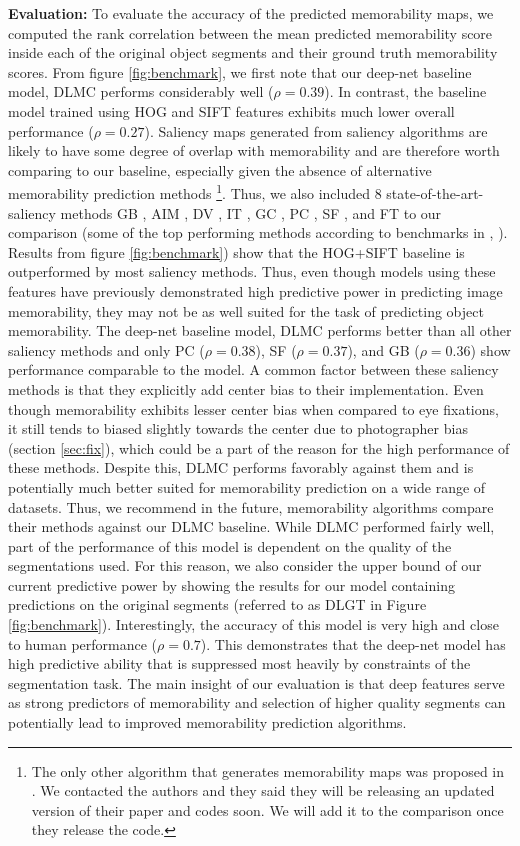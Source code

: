 \textbf{Evaluation: } To evaluate the accuracy of the predicted memorability maps, we computed the rank correlation between the mean predicted memorability score inside each of the original object segments and their ground truth memorability scores. From figure \ref{fig:benchmark}, we first note that our deep-net baseline model, DLMC performs considerably well ($\rho = 0.39$). In contrast, the baseline model trained using HOG and SIFT features exhibits much lower overall performance ($\rho = 0.27$). Saliency maps generated from saliency algorithms are likely to have some degree of overlap with memorability and are therefore worth comparing to our baseline, especially given the absence of alternative memorability prediction methods \footnote{The only other algorithm that generates memorability maps was proposed in \cite{khosla12}. We contacted the authors and they said they will be releasing an updated version of their paper and codes soon. We will add it to the comparison once they release the code.}. Thus, we also included $8$ state-of-the-art-saliency methods GB \cite{gb}, AIM \cite{aim}, DV \cite{dv}, IT \cite{it}, GC \cite{gc}, PC \cite{pc}, SF \cite{sf}, and FT \cite{ft} to our comparison (some of the top performing methods according to benchmarks in \cite{borji13}, \cite{borji12}).  Results from figure \ref{fig:benchmark}) show that the HOG+SIFT baseline is outperformed by most saliency methods. Thus, even though models using these features have previously demonstrated high predictive power in predicting image memorability, they may not be as well suited for the task of predicting object memorability. The deep-net baseline model, DLMC performs better than all other saliency methods and only PC ($\rho=0.38$), SF ($\rho=0.37$), and GB ($\rho=0.36$) show performance comparable to the model. A common factor between these saliency methods is that they explicitly add center bias to their implementation. Even though memorability exhibits lesser center bias when compared to eye fixations, it still tends to biased slightly towards the center due to photographer bias (section \ref{sec:fix}), which could be a  part of the reason for the high performance of these methods. Despite this, DLMC performs favorably against them and is potentially much better suited for memorability prediction on a wide range of datasets. Thus, we recommend in the future, memorability algorithms compare their methods against our DLMC baseline. While DLMC performed fairly well, part of the performance of this model is dependent on the quality of the segmentations used. For this reason, we also consider the upper bound of our current predictive power by showing the results for our model containing predictions on the original segments (referred to as DLGT in Figure \ref{fig:benchmark}). Interestingly, the accuracy of this model is very high and close to human performance ($\rho = 0.7$). This demonstrates that the deep-net model has high predictive ability that is suppressed most heavily by constraints of the segmentation task. The main insight of our evaluation is that deep features serve as strong predictors of memorability and selection of higher quality segments can potentially lead to improved memorability prediction algorithms.

